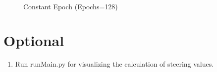 \documentclass[journal,12pt,twocolumn]{IEEEtran}
\numberwithin{equation}{section}
\renewcommand\thesection{\arabic{section}}
\begin{document}
\begin{enumerate}[label=\thesection.\arabic*.,ref=\thesection.\theenumi]
\begin{figure}[!ht]
\begin{centering}
\end{centering}
\caption{Constant Epoch (Epochs=128)}
\end{figure}
\end{enumerate}
\section{Optional}
\begin{enumerate}[label=\thesection.\arabic*.,ref=\thesection.\theenumi]
\item Run runMain.py for visualizing the calculation of steering values.
\end{enumerate}
\end{document}
